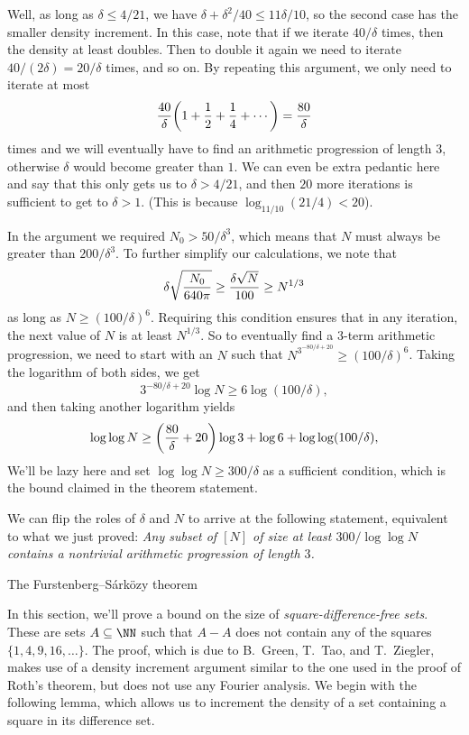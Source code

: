 Well, as long as $\delta \le 4/21$, we have $\delta + \delta^2/40 \le 11\delta/10$, so the
second case has the smaller density increment. In this case, note that if we iterate $40/\delta$ times,
then the density at least doubles. Then to double it again we need to iterate $40/(2\delta) = 20/\delta$
times, and so on. By repeating this argument, we only need to iterate at most
$$ {40\over\delta} \biggl(1 + {1\over 2} + {1\over 4} + \cdots \biggr) = {80\over \delta}$$
times and we will eventually have to find an arithmetic progression of length $3$, otherwise $\delta$ would
become greater than $1$. We can even be extra pedantic here and say that this only gets us to $\delta >4/21$,
and then $20$ more iterations is sufficient to get to $\delta > 1$. (This is because $\log_{11/10}(21/4) < 20$).

In the argument we required $N_0 > 50/\delta^3$, which means that $N$ must always be greater than
$200/\delta^3$. To further simplify our calculations, we note that
$$\delta \sqrt{N_0\over 640\pi } \ge {\delta\sqrt N\over 100} \ge N^{1/3}$$
as long as $N\ge (100/\delta)^6$. Requiring this condition ensures that in any iteration, the next
value of $N$ is at least $N^{1/3}$. So to eventually find a $3$-term arithmetic
progression, we need to start with an $N$ such that $N^{3^{-80/\delta+20}} \ge (100/\delta)^6$.
Taking the logarithm of both sides, we get
$$ 3^{-80/\delta+20} \log N \ge 6\log(100/\delta),$$
and then taking another logarithm yields
$$ \log\log N \ge \biggl({80\over\delta} + 20\biggr)\log 3 +\log 6 + \log\log(100/\delta),$$
We'll be lazy here and set $\log\log N\ge 300/\delta$ as
a sufficient condition, which is the bound claimed in the theorem statement.\slug

We can flip the roles of $\delta$ and $N$ to arrive at the following statement,
equivalent to what we just proved: {\sl Any subset of $[N]$
of size at least $300/\log\log N$ contains a nontrivial arithmetic progression of length $3$.}

\advsect The Furstenberg--S\'ark\"ozy theorem

In this section, we'll prove a bound on the size of {\it square-difference-free sets}. These are sets
$A\subseteq \NN$ such that $A-A$ does not contain any of the squares $\{1,4,9,16,\ldots\}$.
The proof, which is due to B.~Green, T.~Tao, and T.~Ziegler,
makes use of a density increment argument similar to the one used in the proof of
Roth's theorem, but does not use any Fourier analysis. We begin with the following lemma, which allows
us to increment the density of a set containing a square in its difference set.

